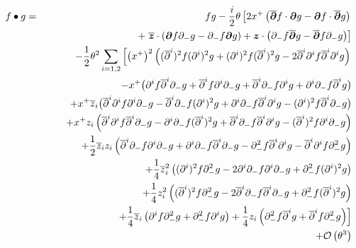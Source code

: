 \begin{eqnarray}
  \label{eq:symtime:positionspace}\nonumber
  f\bullet g&=&f g- \frac{ i}2  \theta \left[
  2x^+ \left( \overline{{{\boldsymbol {\partial} }}}f\cdot{{\boldsymbol {\partial} }} g
  - {{\boldsymbol {\partial} }} f\cdot\overline{{{\boldsymbol {\partial} }}}g\right)\right.\\\nonumber
  &&\qquad\qquad\quad\quad+\left.\overline{{{\boldsymbol {z} }}}\cdot\left({{\boldsymbol {\partial} }} f \partial_- g
  - \partial_- f {{\boldsymbol {\partial} }} g\right)+ {{\boldsymbol {z} }}\cdot\left(\partial_- f \overline{{{\boldsymbol {\partial} }}}g
   - \overline{{{\boldsymbol {\partial} }}}f \partial_- g\right)\right]\\ \nonumber
  &&-  \frac1{2}  \theta^2  \sum\limits_{i=1,2}  
  \left[\left(x^+\right)^2 \left(( \overline{\partial}^{ i})^2f (\partial^i)^2g
  +(\partial^i)^2f ( \overline{\partial}^{ i})^2g
  -2\overline{\partial}^{ i}\partial^if \overline{\partial}^{ i}\partial^ig
  \right)\right.\\ \nonumber &&\qquad
  - x^+ \bigl(\partial^if \overline{\partial}^{ i}\partial_- g
  +\overline{\partial}^{ i}f \partial^i\partial_- g
  +\overline{\partial}^{ i}\partial_- f \partial^ig
  +\partial^i\partial_- f \overline{\partial}^{ i}g\bigr)\\ \nonumber
  &&\qquad
  + x^+ \overline{z}_i \bigl( \overline{\partial}^{ i}\partial^if \partial^i\partial_- g
  -\overline{\partial}^{ i}\partial_- f (\partial^i)^2g
  +\partial^i\partial_- f \overline{\partial}^{ i}\partial^ig
  -(\partial^i)^2f \overline{\partial}^{ i}\partial_- g\bigr)
  \\ \nonumber &&\qquad
  + x^+ z_i \left( \overline{\partial}^{ i}\partial^if \overline{\partial}^{ i}\partial_- g
  -\partial^i\partial_- f ( \overline{\partial}^{ i})^2g
  +\overline{\partial}^{ i}\partial_- f \overline{\partial}^i\partial^ig
  -( \overline{\partial}^{ i})^2f \partial^i\partial_- g\right)\\ \nonumber
  &&\qquad
  +  \frac12  \overline{z}_i z_i \left( 
  \overline{\partial}^{ i}\partial_- f \partial^i\partial_- g
  +\partial^i\partial_- f \overline{\partial}^{ i}\partial_- g
  -\partial_- ^2f \overline{\partial}^{ i}\partial^ig
  -\overline{\partial}^{ i}\partial^if \partial_-^2g\right)
  \\ \nonumber &&\qquad
  +  \frac14  \overline{z}_i^{ 2} 
  \left((\partial^i)^2f \partial_-^2g
  -2\partial^i\partial_- f \partial^i\partial_- g
  +\partial_-^2f (\partial^i)^2g\right)\\ \nonumber &&\qquad
  +  \frac14  z_i^2 
  \left(( \overline{\partial}^{ i})^2f \partial_-^2g
  -2\overline{\partial}^{ i}\partial_- f \overline{\partial}^{ i}\partial_- g
  +\partial_-^2f ( \overline{\partial}^{ i})^2g\right)
  \\ \nonumber &&\qquad
  +\Bigl. \frac14  \overline{z}_i \left(\partial^if \partial_-^2g
  +\partial_-^2f \partial^ig\right)
  + \frac14  z_i \left(\partial_-^2f \overline{\partial}^{ i}g
  +\overline{\partial}^{ i}f \partial_-^2g\right)
  \Bigr]\\\nonumber&&+{\mathcal O}\left(\theta^3\right)
\end{eqnarray}

